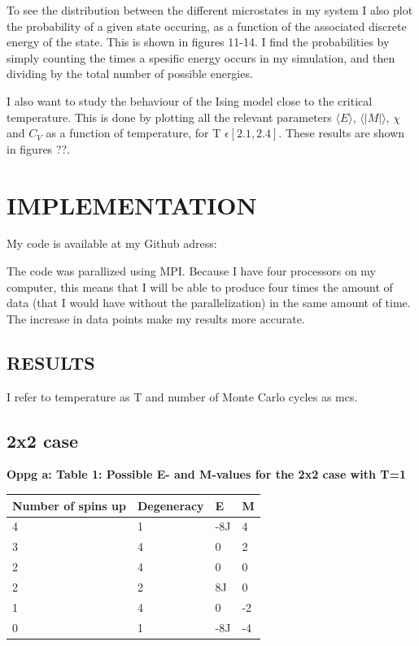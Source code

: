 \documentclass[twocolumn]{article}
\begin{document}
To see the distribution between the different microstates in my system I also plot the probability of a given state occuring, as a function of the associated discrete energy of the state. This is shown in figures 11-14. I find the probabilities by simply counting the times a spesific energy occurs in my simulation, and then dividing by the total number of possible energies.\newline

I also want to study the behaviour of the Ising model close to the  critical temperature. This is done by plotting all the relevant parameters $\langle E \rangle$, $\langle |M| \rangle$, $\chi$ and $C_V$ as a function of temperature, for T $\epsilon[2.1, 2.4]$. These results are shown in figures ??.

\section{IMPLEMENTATION}
My code is available at my Github adress:\newline

The code was parallized using MPI. Because I have four processors on my computer, this means that I will be able to produce four times the amount of data (that I would have without the parallelization) in the same amount of time. The increase in data points make my results more accurate.
\newpage
\onecolumngrid
\begin{center}
\section{RESULTS}
\end{center}
I refer to temperature as T and number of Monte Carlo cycles as mcs.\newline

\centering\subsection{2x2 case}

\begin{center}
\textbf{Oppg a: Table 1: Possible E- and M-values for the 2x2 case with T=1}
\newline
\bigskip
\resizebox{3cm} {
\centering\begin{tabular}{|| l | l | l | l ||}
    \hline
    Number of spins up & Degeneracy & E & M\\
    \hline 
    4 & 1 & -8J & 4 \\
    \hline
    3 & 4 & 0 & 2 \\
    \hline
    2 & 4 & 0 & 0 \\
    \hline
    2 & 2 & 8J & 0 \\
    \hline
    1 & 4 & 0 & -2\\
    \hline
    0 & 1 & -8J & -4 \\
    \hline
\end{tabular}
}\newline
\end{center}
\end{document}

